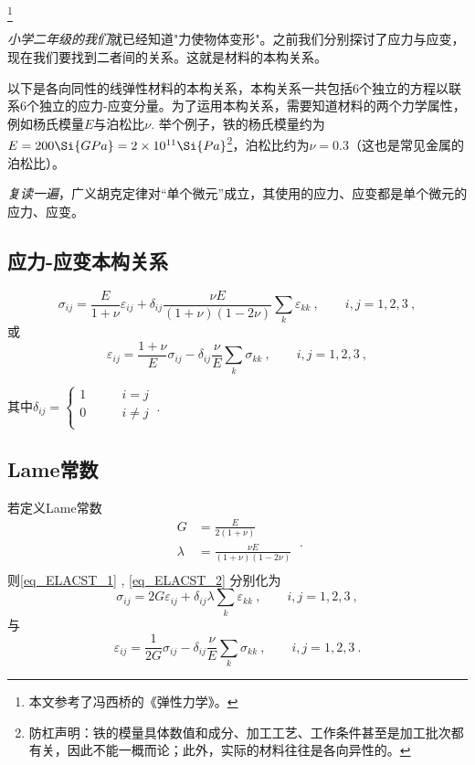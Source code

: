 
\begin{issues}
\issueDraft
\end{issues}
\footnote{本文参考了冯西桥的《弹性力学》。}

\textsl{小学二年级的我们}就已经知道"力使物体变形"。之前我们分别探讨了应力与应变，现在我们要找到二者间的关系。这就是材料的本构关系。

以下是各向同性的线弹性材料的本构关系，本构关系一共包括$6$个独立的方程以联系$6$个独立的应力-应变分量。为了运用本构关系，需要知道材料的两个力学属性，例如杨氏模量$E$与泊松比$\nu$. 举个例子，铁的杨氏模量约为$E = 200 \Si{GPa} = 2 \times 10^{11} \Si{Pa}$\footnote{防杠声明：铁的模量具体数值和成分、加工工艺、工作条件甚至是加工批次都有关，因此不能一概而论；此外，实际的材料往往是各向异性的。}，泊松比约为$\nu=0.3$（这也是常见金属的泊松比）。

\textsl{复读一遍}，广义胡克定律对“单个微元”成立，其使用的应力、应变都是单个微元的应力、应变。

\subsection{应力-应变本构关系}
\begin{equation}\label{eq_ELACST_1}
\sigma_{ij}=\frac{E}{1+\nu}\varepsilon_{ij}+\delta_{ij}\frac{\nu E}{(1+\nu)(1-2\nu)}\sum_k\varepsilon_{kk}~,\qquad i,j=1,2,3~,
\end{equation}
或
\begin{equation}\label{eq_ELACST_2}
\varepsilon_{ij}=\frac{1+\nu}{E}\sigma_{ij}-\delta_{ij}\frac{\nu}{E}\sum_k\sigma_{kk}~, \qquad i,j=1,2,3~,
\end{equation}

其中$\delta_{ij} = \left \{
\begin{aligned}
1 &\qquad i = j\\
0 &\qquad i \ne j\\
\end{aligned}~.
\right.
$

\subsection{Lame常数}
若定义Lame常数
\begin{equation}
\begin{aligned}
G&=\frac{E}{2(1+\nu)}\\
\lambda &= \frac{\nu E}{(1+\nu)(1-2\nu)}\\
\end{aligned}~.
\end{equation}
则\autoref{eq_ELACST_1} , \autoref{eq_ELACST_2} 分别化为
\begin{equation}
\sigma_{ij}=2G\varepsilon_{ij}+\delta_{ij}\lambda\sum_k\varepsilon_{kk}~,\qquad i,j=1,2,3~,
\end{equation}
与
\begin{equation}
\varepsilon_{ij}=\frac{1}{2G}\sigma_{ij}-\delta_{ij}\frac{\nu}{E}\sum_k\sigma_{kk}~, \qquad i,j=1,2,3~.
\end{equation}

